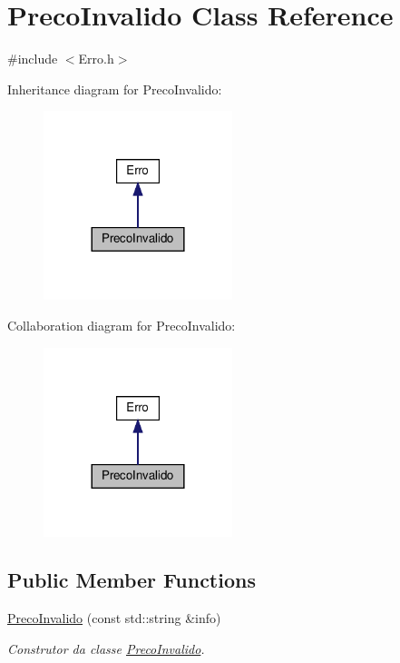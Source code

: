 \hypertarget{classPrecoInvalido}{}\section{Preco\+Invalido Class Reference}
\label{classPrecoInvalido}


{\ttfamily \#include $<$Erro.\+h$>$}



Inheritance diagram for Preco\+Invalido\+:
\nopagebreak
\begin{figure}[H]
\begin{center}
\leavevmode
\includegraphics[width=156pt]{classPrecoInvalido__inherit__graph}
\end{center}
\end{figure}


Collaboration diagram for Preco\+Invalido\+:
\nopagebreak
\begin{figure}[H]
\begin{center}
\leavevmode
\includegraphics[width=156pt]{classPrecoInvalido__coll__graph}
\end{center}
\end{figure}
\subsection*{Public Member Functions}
\begin{DoxyCompactItemize}
\item 
\hyperlink{classPrecoInvalido_a596bb49295f1cd9454797a4db70b5b77}{Preco\+Invalido} (const std\+::string \&info)
\begin{DoxyCompactList}\small\item\em Construtor da classe \hyperlink{classPrecoInvalido}{Preco\+Invalido}. \end{DoxyCompactList}\end{DoxyCompactItemize}


